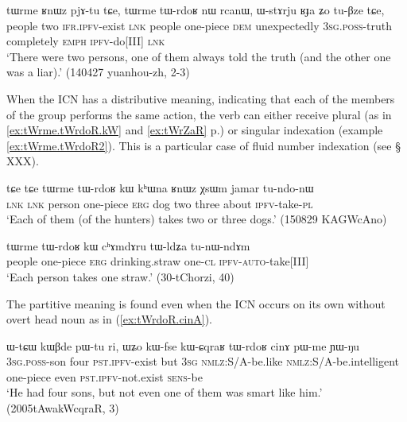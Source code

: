 \begin{exe}
\ex \label{ex:tWrme.tWrdoR.RnWz}
\gll tɯrme ʁnɯz pjɤ-tu tɕe, tɯrme tɯ-rdoʁ nɯ rcanɯ, ɯ-stɤrju ʁɟa ʑo tu-βze tɕe, \\
people two \textsc{ifr}.\textsc{ipfv}-exist \textsc{lnk} people one-piece \textsc{dem} unexpectedly \textsc{3sg}.\textsc{poss}-truth completely \textsc{emph} \textsc{ipfv}-do[III] \textsc{lnk} \\
\glt `There were two persons, one of them always told the truth (and the other one was a liar).' (140427 yuanhou-zh, 2-3)
\end{exe} 

When the ICN has a distributive meaning, indicating that each of the members of the group performs the same action, the verb can either receive plural (as in \ref{ex:tWrme.tWrdoR.kW} and \ref{ex:tWrZaR} p.\pageref{ex:tWrZaR}) or singular indexation (example \ref{ex:tWrme.tWrdoR2}). This is a particular case of fluid number indexation (see § XXX).

\begin{exe}
\ex \label{ex:tWrme.tWrdoR.kW}
\gll  tɕe tɕe tɯrme tɯ-rdoʁ kɯ kʰɯna ʁnɯz χsɯm jamar tu-ndo-nɯ \\
\textsc{lnk} \textsc{lnk}  person one-piece \textsc{erg} dog two three about \textsc{ipfv}-take-\textsc{pl} \\
\glt `Each of them (of the hunters) takes two or three dogs.' (150829 KAGWcAno)
\end{exe} 

\begin{exe}
\ex \label{ex:tWrme.tWrdoR2}
\gll tɯrme tɯ-rdoʁ kɯ cʰɤmdɤru tɯ-ldʑa tu-nɯ-ndɤm  \\
people one-piece \textsc{erg} drinking.straw one-\textsc{cl} \textsc{ipfv-auto}-take[III] \\
\glt `Each person takes one straw.' (30-tChorzi, 40)
\end{exe}

The partitive meaning is found even when the ICN occurs on its own without overt head noun as in (\ref{ex:tWrdoR.cinA}).

 \begin{exe}
\ex \label{ex:tWrdoR.cinA}
\gll ɯ-tɕɯ kɯβde pɯ-tu ri, ɯʑo kɯ-fse kɯ-ɕqraʁ tɯ-rdoʁ cinɤ pɯ-me ɲɯ-ŋu 	\\
\textsc{3sg.poss}-son four \textsc{pst.ipfv}-exist but \textsc{3sg} \textsc{nmlz}:S/A-be.like \textsc{nmlz}:S/A-be.intelligent one-piece even \textsc{pst.ipfv}-not.exist \textsc{sens}-be \\
\glt `He had four sons, but not even one of them was smart like him.' (2005tAwakWcqraR, 3)
\end{exe} 

